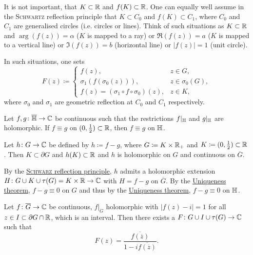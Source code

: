 \documentclass[a4paper,english]{article}
\begin{document}
\begin{remark}[Generalisation] \label{remark:generalisation}
    It is not important, that $K \subset \operatorname{\mathbb{R}}$ and $f(K) \subset \operatorname{\mathbb{R}}$.
    One can equally well assume in the \textsc{Schwartz} reflection principle that $K \subset C_0$ and $f(K) \subset C_1$, where $C_0$ and $C_1$ are generalised circles (i.e. circles or lines).
    Think of such situations as $K \subset \operatorname{\mathbb{R}}$ and $\arg(f(z)) = \alpha$ ($K$ is mapped to a ray) or $\Re(f(z)) = a$ ($K$ is mapped to a vertical line) or $\Im(f(z)) = b$ (horizontal line) or $| f(z) | = 1$ (unit circle).
    
    In such situations, one sets
    \begin{equation*}
        F(z) \coloneqq \begin{cases}
        f(z), & z \in G, \\
        \sigma_1(f(\sigma_0(z))), & z \in \sigma_0(G), \\
        f(z) = (\sigma_1 \circ f \circ \sigma_0)(z), & z \in K,
        \end{cases}
    \end{equation*}
    where $\sigma_0$ and $\sigma_1$ are geometric reflection at $C_0$ and $C_1$ respectively.
\end{remark}

\begin{cor}
    Let $f, g \colon \overline{\mathbb{H}} \to \operatorname{\mathbb{C}}$ be continuous such that the restrictions $f|_{\mathbb{H}}$ and $g|_{\mathbb{H}}$ are holomorphic.
    If $f \equiv g$ on $(0,\frac{1}{2}) \subset \operatorname{\mathbb{R}}$, then $f \equiv g$ on $\mathbb{H}$.
\end{cor}

\begin{pr}
    Let $h \colon G \to \operatorname{\mathbb{C}}$ be defined by $h \coloneqq f - g$, where $G \coloneqq K \times \operatorname{\mathbb{R}}_+$ and $K \coloneqq (0, \frac{1}{2}) \subset \operatorname{\mathbb{R}}$.
    Then $K \subset \partial G$ and $h(K) \subset \operatorname{\mathbb{R}}$ and $h$ is holomorphic on $G$ and continuous on $\overline{G}$.
    
    By the \hyperref[th:reflection]{\textsc{Schwarz} reflection principle}, $h$ admits a holomorphic extension $H \colon G \cup K \cup \tau(G) = K \times \operatorname{\mathbb{R}} \to \operatorname{\mathbb{C}}$ with $H = f - g$ on $\overline{G}$.
    By the \hyperref[th:unique]{Uniqueness theorem}, $f - g \equiv 0$ on $G$ and thus by the \hyperref[th:unique]{Uniqueness theorem}, $f - g \equiv 0$ on $\mathbb{H}$.
\end{pr}

\begin{cor}
    Let $f \colon \overline{G} \to \operatorname{\mathbb{C}}$ be continuous, $f|_G$ holomorphic with $| f(z) - i | = 1$ for all $z \in I \subset \partial G \cap \operatorname{\mathbb{R}}$, which is an interval.
    Then there exists a $F \colon G \cup I \cup \tau(G) \to \operatorname{\mathbb{C}}$ such that
    \begin{equation*}
        F(z)
        = \frac{\overline{f(\overline{z})}}{1 - i \overline{f(\overline{z})}}.
    \end{equation*}
\end{cor}
\end{document}
